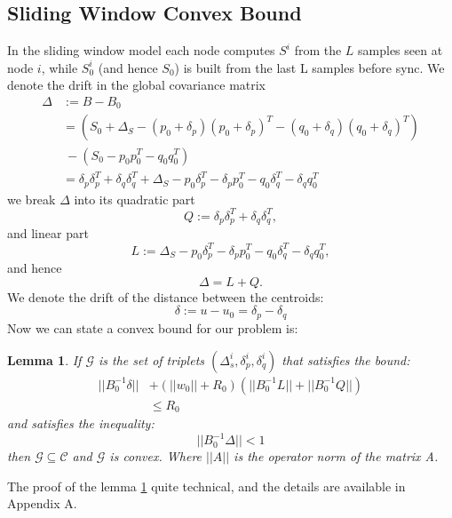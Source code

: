 \documentclass[11pt,twocolumn,varwidth=true,a4paper,fleqn]{article}
\newtheorem{lemma}{Lemma}
\begin{document}
\subsection{Sliding Window Convex Bound}
In the sliding window model each node computes $S^i$ from the $L$ samples seen
at node $i$, while $S_0^i$ (and hence $S_0$) is built from the last L samples before
sync. 
We denote the drift in the global covariance matrix
\begin{equation*}
\begin{split}
\Delta & :=B-B_0 \\
& = (S_0+\Delta_S - (p_0+\delta_p)(p_0+\delta_p)^T -
(q_0+\delta_q)(q_0+\delta_q)^T) \\
& \ - (S_0 - p_0p_0^T - q_0q_0^T) \\
& = \delta_p\delta_p^T + \delta_q\delta_q^T + \Delta_S - p_0\delta_p^T -
\delta_pp_0^T - q_0\delta_q^T - \delta_qq_0^T
\end{split}
\end{equation*}
we break $\Delta$ into its quadratic part
\begin{equation*}
Q:=\delta_p\delta_p^T + \delta_q\delta_q^T, 
\end{equation*}
and linear part
\begin{equation*}
L:= \Delta_S - p_0\delta_p^T - \delta_pp_0^T - q_0\delta_q^T - \delta_qq_0^T, 
\end{equation*}
and hence 
\begin{equation*}
\Delta= L+ Q.
\end{equation*}
We denote the drift of the distance between the centroids:
\begin{equation*}
\delta:= u-u_0 = \delta_p - \delta_q
\end{equation*}
Now we can state a convex bound for our problem is:
\begin{lemma} \label{convexBound}
If $\mathcal{G}$ is the set of triplets $(\Delta_s^i, \delta_p^i, \delta_q^i)$
 that satisfies the bound:
 \begin{equation*} 
\begin{split}
||B_0^{-1}\delta|| &+ (||w_0||+R_0)(||B_0^{-1}L||+||B_0^{-1}Q||) \\ & \leq  R_0
\end{split}
\end{equation*}
and satisfies the inequality:
 \begin{equation*} 
||B_0^{-1}\Delta|| < 1
\end{equation*}
 then $\mathcal{G}
 \subseteq \mathcal{C}$ and $\mathcal{G}$ is convex.
Where $||A||$ is the operator norm of the matrix A.
\end{lemma}
The proof of the lemma \ref{convexBound} quite technical, and
the details are available in Appendix A.
\end{document}
